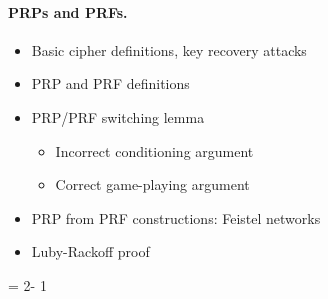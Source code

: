 \begin{figure}
\end{figure}

\paragraph{PRPs and PRFs.}

\begin{itemize}
\item Basic cipher definitions, key recovery attacks
\item PRP and PRF definitions
\item PRP/PRF switching lemma
\begin{itemize}
  \item Incorrect conditioning argument 
  \item Correct game-playing argument
\end{itemize}
\item PRP from PRF constructions: Feistel networks
\item Luby-Rackoff proof
\end{itemize}


\begin{figure}
\end{figure}

\bnm
\AdvPRP{\cipher}{\advA} = 2\cdotsm\Prob{\PRP^\advA_\cipher\Rightarrow\true}- 1
\enm

